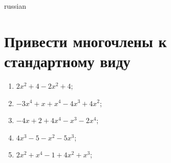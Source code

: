 \documentclass[a4paper]{article}
\begin{document}
\begin{otherlanguage*}{russian}

\section{Привести многочлены к стандартному виду}
\begin{enumerate}
\item $2x^{2} + 4 - 2x^{2} + 4$;
\item $-3x^{4} + x + x^{4} - 4x^{3} + 4x^{2}$;
\item $-4x + 2 + 4x^{4} - x^{3} - 2x^{4}$;
\item $4x^{3} - 5 - x^{2} - 5x^{3}$;
\item $2x^{2} + x^{4} - 1 + 4x^{2} + x^{3}$;
\end{enumerate}
\end{otherlanguage*}
\end{document}

